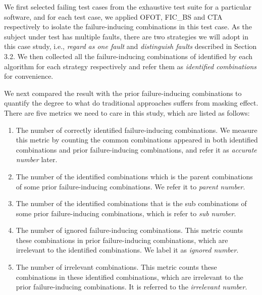 \documentclass{sig-alternate}
\begin{document}

We first selected failing test cases from the exhaustive test suite for a particular software, and for each test case, we applied OFOT, FIC\_BS and CTA respectively to isolate the failure-inducing combinations in this test case.  As the subject under test has multiple faults, there are two strategies we will adopt in this case study, i.e., \emph{regard as one fault} and \emph{distinguish faults} described in Section 3.2. We then collected all the failure-inducing combinations of identified by each algorithm for each strategy respectively and refer them as \emph{identified combinations} for convenience.
%
%

We next compared the result with the prior failure-inducing combinations to quantify the degree to what do traditional approaches suffers from masking effect. There are five metrics we need to care in this study, which are listed as follows:
 \begin{enumerate}
 \item The number of correctly identified failure-inducing combinations. We measure this metric by counting the common combinations appeared in both identified combinations and prior failure-inducing combinations, and refer it as \emph{accurate number} later.
 \item The number of the identified combinations which is the parent combinations of some prior failure-inducing combinations. We refer it to \emph{parent number}.
 \item The number of the identified combinations that is the sub combinations of some prior failure-inducing combinations, which is refer to \emph{sub number}.
 \item The number of ignored failure-inducing combinations. This metric counts these combinations in prior failure-inducing combinations, which are irrelevant to the identified combinations. We label it as \emph{ignored number}.
 \item The number of irrelevant combinations. This metric counts these combinations in these identified combinations, which are irrelevant to the prior failure-inducing combinations. It is referred to the \emph{irrelevant number}.

\end{enumerate}
\end{document}
